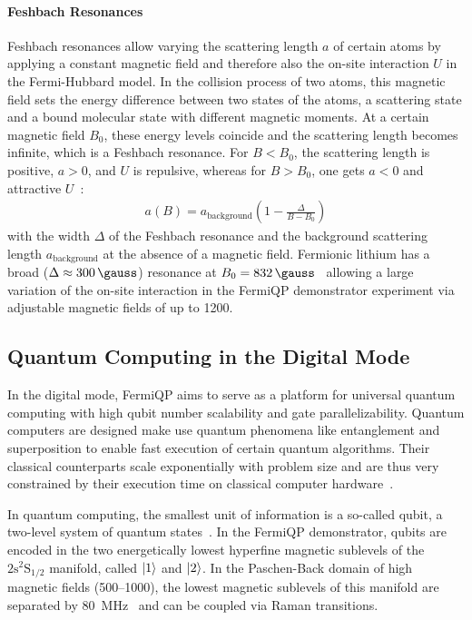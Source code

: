 \paragraph*{Feshbach Resonances} Feshbach resonances allow varying the scattering length $a$ of certain atoms by applying a constant magnetic field and therefore also the on-site interaction $U$ in the Fermi-Hubbard model. In the collision process of two atoms, this magnetic field sets the energy difference between two states of the atoms, a scattering state and a bound molecular state with different magnetic moments. At a certain magnetic field $B_0$, these energy levels coincide and the scattering length becomes infinite, which is a Feshbach resonance. For $B < B_0$, the scattering length is positive, $a > 0$, and $U$ is repulsive, whereas for $B > B_0$, one gets $a < 0$ and attractive $U$~\cite{chin_feshbach_2010}:
\begin{align}
    a(B) = a_\text{background} \left(1 - \frac{\Delta}{B-B_0}\right)
\end{align}
with the width $\Delta$ of the Feshbach resonance and the background scattering length $a_\text{background}$ at the absence of a magnetic field. Fermionic lithium has a broad ($\Delta \approx \SI[]{300}{\gauss}$) resonance at $B_0 = \SI[]{832}{\gauss}$~\cite{zurn_precise_2013} allowing a large variation of the on-site interaction in the FermiQP demonstrator experiment via adjustable magnetic fields of up to \SI[]{1200}{\gauss}.

\subsection*{Quantum Computing in the Digital Mode}\label{ch:digital_mode}
In the digital mode, FermiQP aims to serve as a platform for universal quantum computing with high qubit number scalability and gate parallelizability. Quantum computers are designed make use quantum phenomena like entanglement and superposition to enable fast execution of certain quantum algorithms. Their classical counterparts scale exponentially with problem size and are thus very constrained by their execution time on classical computer hardware~\cite{nielsen_quantum_2010, hidary_quantum_2021, ladd_quantum_2010, mainzer_quantencomputer_2020}.

In quantum computing, the smallest unit of information is a so-called qubit, a two-level system of quantum states~\cite{nielsen_quantum_2010, hidary_quantum_2021, ladd_quantum_2010, mainzer_quantencomputer_2020}. In the FermiQP demonstrator, qubits are encoded in the two energetically lowest hyperfine magnetic sublevels of the $2\text{s}^2\text{S}_{1/2}$ manifold, called $\Ket{1}$ and $\Ket{2}$. In the Paschen-Back domain of high magnetic fields (\SIrange[]{500}{1000}{\gauss}), the lowest magnetic sublevels of this manifold are separated by \SI[]{80}{\mega\hertz}~\cite{gehm_properties_2003,wei_magnetic-field_2013} and can be coupled via Raman transitions.

